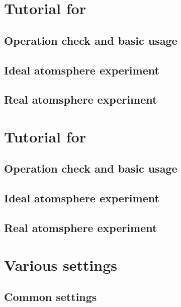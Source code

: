 \documentclass[a4paper]{report}
\begin{document}
\part{Tutorial for \scalerm}
 \chapter{Operation check and basic usage} \label{chap:tutorial_ideal}
 
 
 
 

 \chapter{Ideal atomsphere experiment} %

 \chapter{Real atomsphere experiment} \label{chap:tutorial_real}
 
 
 
 
 
 
 


\part{Tutorial for \scalegm}
 \chapter{Operation check and basic usage}
 
 
 \chapter{Ideal atomsphere experiment}
 
 \chapter{Real atomsphere experiment}


\part{Various settings} \label{part:basic_usel}
 \chapter{Common settings}
 
 
 
 
\end{document}
